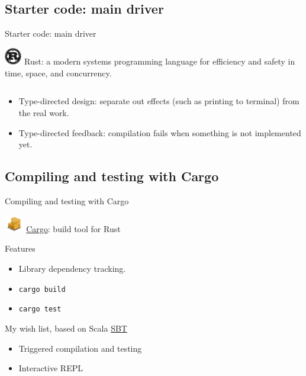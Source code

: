 \subsection{Starter code: main driver}

\begin{frame}[fragile]{Starter code: main driver}
  \begin{block}{\includegraphics[height=0.75cm]{rust-logo-128x128-blk-v2.png}}
    Rust: a modern systems programming language for efficiency and safety in time, space, and concurrency.
  \end{block}

  \inputminted{rust}{Main1.rs}

  \begin{itemize}
  \item Type-directed design: separate out effects (such as printing to terminal) from the real work.
  \item Type-directed feedback: compilation fails when something is not implemented yet.
  \end{itemize}
\end{frame}

\subsection{Compiling and testing with Cargo}

\begin{frame}[fragile]{Compiling and testing with Cargo}
  \begin{block}{\includegraphics[height=0.75cm]{Cargo-Logo-Small.png}}
    \href{http://crates.io/}{Cargo}: build tool for Rust
  \end{block}

  \begin{block}{Features}
    \begin{itemize}
    \item Library dependency tracking.
    \item \texttt{cargo build}
    \item \texttt{cargo test}
    \end{itemize}
  \end{block}

  \begin{block}{My wish list, based on Scala \href{http://www.scala-sbt.org/}{SBT}}
    \begin{itemize}
    \item Triggered compilation and testing
    \item Interactive REPL
    \end{itemize}
  \end{block}
\end{frame}

